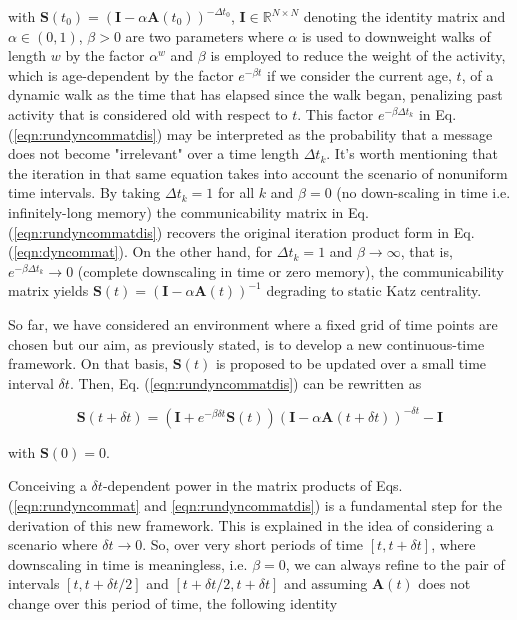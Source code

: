  with $\mathbf{S}(t_0) = (\mathbf{I} - \alpha \mathbf{A}(t_0))^{-\Delta t_0}$, $\mathbf{I}\in \mathbb{R}^{N\times N}$ denoting the identity matrix and $\alpha \in (0,1)$, $\beta > 0$ are two parameters where $\alpha$ is used to downweight walks of length $w$ by the factor $\alpha^w$ and $\beta$ is employed to reduce the weight of the activity, which is age-dependent by the factor $e^{-\beta t}$ if we consider the current age, $t$, of a dynamic walk as the time that has elapsed since the walk began, penalizing past activity that is considered old with respect to $t$. This factor $e^{-\beta\Delta t_k}$ in Eq. (\ref{eqn:rundyncommatdis}) may be interpreted as the probability that a message does not become "irrelevant" over a time length $\Delta t_k$. It's worth mentioning that the iteration in that same equation takes into account the scenario of nonuniform time intervals. By taking $\Delta t_k = 1$ for all $k$ and $\beta = 0$ (no down-scaling in time i.e. infinitely-long memory) the communicability matrix in Eq. (\ref{eqn:rundyncommatdis}) recovers the original iteration product form in Eq. (\ref{eqn:dyncommat}). On the other hand, for $\Delta t_k = 1$ and $\beta \to \infty$, that is, $e^{-\beta\Delta t_k}\to 0$ (complete downscaling in time or zero memory), the communicability matrix yields $\mathbf{S}(t)=(\mathbf{I} - \alpha \mathbf{A}(t))^{-1}$ degrading to static Katz centrality.

 So far, we have considered an environment where a fixed grid of time points are chosen but our aim, as previously stated, is to develop a new continuous-time framework. On that basis, $\mathbf{S}(t)$ is proposed to be updated over a small time interval $\delta t$. Then, Eq. (\ref{eqn:rundyncommatdis}) can be rewritten as
 
 \begin{equation}
\label{eqn:rundyncommat}
    \mathbf{S}(t + \delta t) = (\mathbf{I} + e^{-\beta\delta t}\mathbf{S}(t)) (\mathbf{I} - \alpha\mathbf{A}(t+\delta t))^{-\delta t} - \mathbf{I}
\end{equation} 

with $\mathbf{S}(0)=0$.

Conceiving a $\delta t$-dependent power in the matrix products of Eqs. (\ref{eqn:rundyncommat} and \ref{eqn:rundyncommatdis}) is a fundamental step for the derivation of this new framework. This is explained in the idea of considering a scenario where $\delta t \to 0$. So, over very short periods of time $[t,t+\delta t]$, where downscaling in time is meaningless, i.e. $\beta = 0$, we can always refine to the pair of intervals $[t, t + \delta t/2]$ and $[t + \delta t/2, t + \delta t]$ and assuming $\mathbf{A}(t)$ does not change over this period of time, the following identity 

